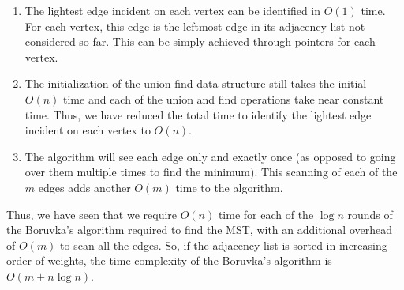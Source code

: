 \documentclass[9pt]{article}
\begin{document}
\begin{enumerate}
    \item The lightest edge incident on each vertex can be identified in $O(1)$ time. For each
    vertex, this edge is the leftmost edge in its adjacency list not considered so far. This can be
    simply achieved through pointers for each vertex.
    \item The initialization of the union-find data structure still takes the initial $O(n)$ time and
    each of the union and find operations take near constant time. Thus, we have reduced the total
    time to identify the lightest edge incident on each vertex to $O(n)$.
    \item The algorithm will see each edge only and exactly once (as opposed to
    going over them multiple times to find the minimum). This scanning of each of the $m$ edges adds
    another $O(m)$ time to the algorithm.
\end{enumerate}
Thus, we have seen that we require $O(n)$ time for each of the $\log{n}$ rounds of the Boruvka's
algorithm required to find the MST, with an additional overhead of $O(m)$ to scan all the edges. So,
if the adjacency list is sorted in increasing order of weights, the time complexity of the Boruvka's
algorithm is $O(m + n \log{n})$.
\end{document}
